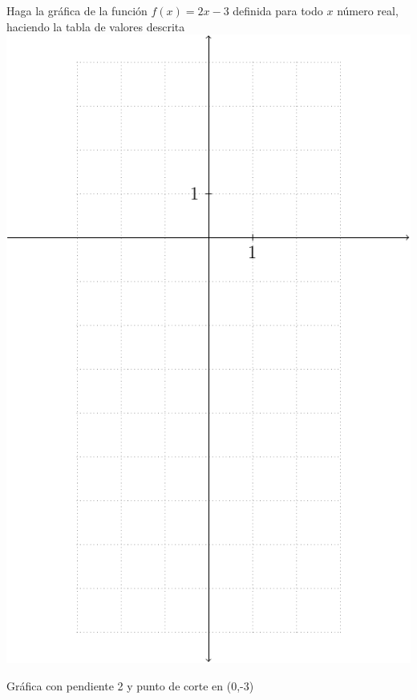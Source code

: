 \documentclass[letterpaper,10pt]{examdesign}
\begin{document}
\begin{shortanswer}
\begin{question}
Haga la gráfica de la función $f(x)=2x-3$ definida para todo $x$ número real, haciendo la tabla de valores descrita
\includegraphics[scale=1]{Images/plano.pdf}
  \begin{answer}
  Gráfica con pendiente 2 y punto de corte en (0,-3)
  \end{answer}
\end{question}
\end{shortanswer}
\end{document}
